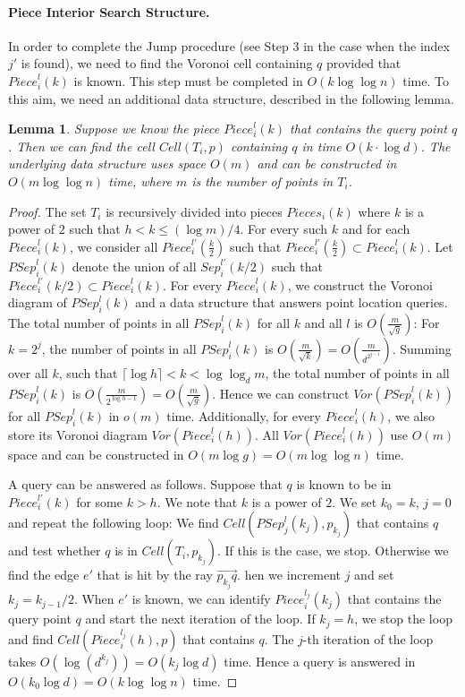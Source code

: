 \documentclass[10pt,a4paper]{amsart}
\newcommand{\ovar}[1]{\overrightarrow{#1}}
\newcommand{\Cell}{\mathit{Cell}}
\newcommand{\Piece}{\mathit{Piece}}
\newcommand{\Sep}{\mathit{Sep}}
\newcommand{\PSep}{\mathit{PSep}}
\newcommand{\Voron}{\mathit{Vor}}
\newtheorem{lemma}{Lemma}
\begin{document}
\paragraph*{Piece Interior Search Structure.}
In order to complete the Jump procedure (see Step 3 in the case when the index $j'$ is found), we need to find the Voronoi cell containing $q$ provided that $\Piece^l_i(k)$ is known. This step must be completed in $O(k\log \log n)$ time. To this aim, we need an additional data structure, described in  the following lemma.
\begin{lemma}
  \label{lemma:pl-regions}
Suppose we know the piece  $\Piece^l_i(k)$  that contains the query point $q$.
Then we can find the cell $\Cell(T_i,p)$ containing  $q$ in time $O(k\cdot \log d)$. The underlying data structure uses space $O(m)$  and can be constructed in $O(m\log\log n)$ time, where $m$ is the number of points in $T_i$.
\end{lemma}
\begin{proof}
  The set $T_i$ is recursively divided into pieces $Pieces_i(k)$  where $k$ is a power of $2$ such that  $h< k  \le (\log m)/4$. 
For every such $k$ and for each $\Piece^l_i(k)$, we consider all $\Piece^{l'}_i(\frac{k}{2})$ such that $\Piece^{l'}_i(\frac{k}{2})\subset \Piece^l_i(k)$.  Let $\PSep^l_i(k)$ denote the union of all $\Sep^{l'}_i(k/2)$ such that $\Piece^{l'}_i(k/2)\subset \Piece^l_i(k)$.
For every $\Piece^l_i(k)$, we construct the Voronoi diagram of $\PSep_i^l(k)$ and a data structure that answers point location queries. The total number of points in all $P\Sep^l_i(k)$ for all $k$ and all $l$ is $O(\frac{m}{\sqrt{g}})$: For $k=2^j$, the number of points in all $P\Sep^l_i(k)$ is $O(\frac{m}{\sqrt{k}})=O(\frac{m}{d^{2^{j-1}}})$. Summing over all $k$, such that $\lceil\log h\rceil <  k < \log\log_d m$, the total number of points in all $P\Sep^l_i(k)$ is $O(\frac{m}{2^{\log h-1}})=O(\frac{m}{\sqrt{g}})$.   Hence we can construct $\Voron(\PSep^l_i(k))$ for all $\PSep^l_i(k)$ in $o(m)$ time.
Additionally, for every $\Piece^l_i(h)$, we also store its Voronoi diagram $\Voron(\Piece_i^l(h))$.  All $\Voron(\Piece_i^l(h))$ use $O(m)$ space and can be constructed in $O(m \log g)=O(m\log\log n)$ time.  

A query can be answered as follows. Suppose that $q$ is known to be in $\Piece^{l'}_i(k)$ for some $k>h$. We note that $k$ is a power of $2$.
We set $k_0=k$, $j=0$ and repeat the following loop:
We find $\Cell(\PSep^l_j(k_j),p_{k_j})$ that contains $q$ and test whether $q$ is in $\Cell(T_i,p_{k_j})$. If this is the case, we stop. Otherwise we  find the edge $e'$ that is hit by the ray $\ovar{p_{k_j}q}$.  hen we increment $j$ and  set $k_j=k_{j-1}/2$. When $e'$ is known, we can identify 
$\Piece^{l_j}_i(k_{j})$ that contains the query point $q$ and start the next iteration of the loop.
If  $k_j=h$, we stop the loop and find $\Cell(\Piece^{l_j}_i(h), p)$ that contains $q$. The $j$-th iteration of the loop takes $O(\log(d^{k_j}))=O(k_j\log d)$ time. Hence a query is answered in $O(k_0\log d)=O(k\log \log n)$ time.
\end{proof}
\end{document}
